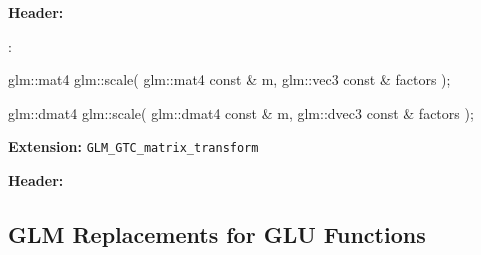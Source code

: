 \documentclass{scrartcl}
\numberwithin{figure}{subsection}
\begin{document}
\textbf{Header:} 

:

\begin{cppcode}
glm::mat4 glm::scale(
  glm::mat4 const & m,
  glm::vec3 const & factors
);

glm::dmat4 glm::scale(
  glm::dmat4 const & m, 
  glm::dvec3 const & factors
);
\end{cppcode}

\textbf{Extension:} \verb|GLM_GTC_matrix_transform|

\textbf{Header:} 
 

\subsection{GLM Replacements for GLU Functions}
\end{document}
